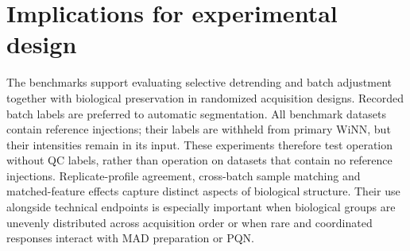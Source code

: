 \documentclass[namedate,webpdf,modern,large,nocrop]{oup-authoring-template}
\begin{document}
\section{Implications for experimental design}
\label{sec:supp_scope}

The benchmarks support evaluating selective detrending and batch adjustment together with biological preservation in randomized acquisition designs. Recorded batch labels are preferred to automatic segmentation. All benchmark datasets contain reference injections; their labels are withheld from primary WiNN, but their intensities remain in its input. These experiments therefore test operation without QC labels, rather than operation on datasets that contain no reference injections. Replicate-profile agreement, cross-batch sample matching and matched-feature effects capture distinct aspects of biological structure. Their use alongside technical endpoints is especially important when biological groups are unevenly distributed across acquisition order or when rare and coordinated responses interact with MAD preparation or PQN.



\end{document}
